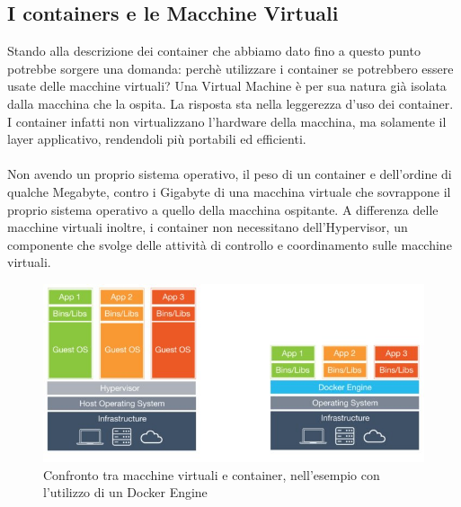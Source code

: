 \subsection{I containers e le Macchine Virtuali}
Stando alla descrizione dei container che abbiamo dato fino a questo punto potrebbe sorgere una domanda: perchè utilizzare i container se potrebbero essere usate delle macchine virtuali? Una Virtual Machine è per sua natura già isolata dalla macchina che la ospita. La risposta sta nella leggerezza d'uso dei container. I container infatti non virtualizzano l'hardware della macchina, ma solamente il layer applicativo, rendendoli più portabili ed efficienti.

\paragraph{}
Non avendo un proprio sistema operativo, il peso di un container e dell'ordine di qualche Megabyte, contro i Gigabyte di una macchina virtuale che sovrappone il proprio sistema operativo a quello della macchina ospitante. A differenza delle macchine virtuali inoltre, i container non necessitano dell'Hypervisor, un componente che svolge delle attività di controllo e coordinamento sulle macchine virtuali. 

\begin{figure}[h!]
	\centering
	\includegraphics[width=\textwidth,keepaspectratio=true]{capitoli/imgs/ContainersvsVms.PNG}
	\caption{Confronto tra macchine virtuali e container, nell'esempio con l'utilizzo di un Docker Engine}
\end{figure}

